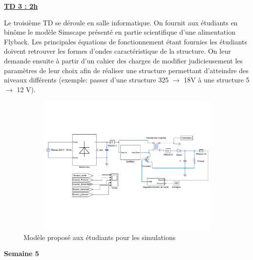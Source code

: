 \documentclass[12pt]{article}
\begin{document}
\begin{adjustwidth}{5em}{0pt}
\color{blue}
\hspace{20pt}\textbf{\underline{TD 3 : 2h}}\par
\vspace{10pt}
\color{black}
Le troisième TD se déroule en salle informatique. On fournit aux étudiants en binôme le modèle Simscape présenté en partie scientifique d'une alimentation Flyback. Les principales équations de fonctionnement étant fournies les étudiants doivent retrouver les formes d'ondes caractéristique de la structure. On leur demande ensuite à partir d'un cahier des charges de modifier judicieusement les paramètres de leur choix afin de réaliser une structure permettant d'atteindre des niveaux différents (exemple: passer d'une structure 325 $\rightarrow$ 18V à une structure 5 $\rightarrow$ 12 V).\par 
\vspace{10pt}
\newpage
\begin{figure}[!h]
\centering
\includegraphics[width=12cm,height=7cm,trim=0cm 5cm 0cm 5cm, clip=true]{Images_Rapport/flyback_simscape}
\caption{Modèle proposé aux étudiants pour les simulations}
\end{figure} 



 

\end{adjustwidth}



\vspace{10pt}

\color{red}
\textbf{Semaine 5}
\end{document}
